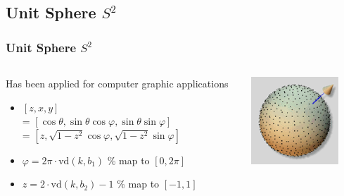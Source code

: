 \documentclass[serif]{beamer} %
\begin{document}
\subsection{Unit Sphere $S^2$}
\begin{frame}[fragile]
\frametitle{Unit Sphere $S^2$}
\begin{columns}
\begin{column}{0.6\textwidth}
  Has been applied for computer graphic applications~\cite{wong1997sampling}
  \begin{itemize}
    \item $[z, x, y]$ \\
      = $[\cos\theta, \sin\theta\cos\varphi, \sin\theta\sin\varphi]$ \\
      = $[z, \sqrt{1-z^2}\cos\varphi, \sqrt{1-z^2}\sin\varphi]$
    \item $\varphi = 2\pi\cdot\mathrm{vd}(k,b_1)$ \% map to $[0,2\pi] $
    \item $z = 2\cdot\mathrm{vd}(k,b_2) - 1$ \% map to $[-1,1]$
  \end{itemize}
\end{column}
\begin{column}{0.4\textwidth}
  \centerline{\includegraphics[width=0.8\textwidth]{thammer.png}}
\end{column}
\end{columns}
\end{frame}
\end{document}

